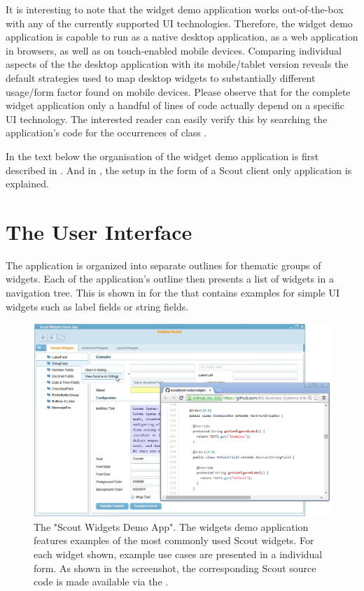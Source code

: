 \documentclass[a4paper,10pt,twoside]{book}
\begin{document}
{It is interesting to note that the widget demo application works out-of-the-box with any of the currently supported UI technologies. 
Therefore, the widget demo application is capable to run as a native desktop application, as a web application in browsers, as well as on touch-enabled mobile devices. 
Comparing individual aspects of the the desktop application with its mobile/tablet version reveals the default strategies used to map desktop widgets to substantially different usage/form factor found on mobile devices. 
Please observe that for the complete widget application only a handful of lines of code actually depend on a specific UI technology. 
The interested reader can easily verify this by searching the application's code for the occurrences of class .

In the text below the organisation of the widget demo application is first described in . 
And in , the setup in the form of a Scout client only application is explained.

\section{The User Interface}

The application is organized into separate outlines for thematic groups of widgets. 
Each of the application's outline then presents a list of widgets in a navigation tree.
This is shown in  for the  that contains examples for simple UI widgets such as label fields or string fields.

\begin{figure}
\includegraphics[width=14cm]{widgetapp_github_menu.png}
\caption{The "Scout Widgets Demo App". 
The widgets demo application features examples of the most commonly used Scout widgets.
For each widget shown, example use cases are presented in a individual form. 
As shown in the screenshot, the corresponding Scout source code is made available via the . }
\end{figure}

}
\end{document}
